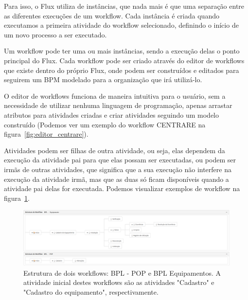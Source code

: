 Para isso, o Flux utiliza de instâncias, que nada mais é que uma separação entre as diferentes execuções de um workflow. Cada instância é criada quando executamos a primeira atividade do workflow selecionado, definindo o início de um novo processo a ser executado.

Um workflow pode ter uma ou mais instâncias, sendo a execução delas o ponto principal do Flux.
Cada workflow pode ser criado através do editor de workflows que existe dentro do próprio Flux, onde podem ser construídos e editados para seguirem um BPM modelado para a organização que irá utilizá-lo.

O editor de workflows funciona de maneira intuitiva para o usuário, sem a necessidade de utilizar nenhuma linguagem de programação, apenas arrastar atributos para atividades criadas e criar atividades seguindo um modelo construído (Podemos ver um exemplo do workflow CENTRARE na figura~\ref{fig:editor_centrare}).

Atividades podem ser filhas de outra atividade, ou seja, elas dependem da execução da atividade pai para que elas possam ser executadas, ou podem ser irmãs de outras atividades, que significa que a sua execução não interfere na execução da atividade irmã, mas que as duas só ficam disponíveis quando a atividade pai delas for executada. Podemos visualizar exemplos de workflow na figura~\ref{fig:estrutura_workflow}.

\begin{figure}
    \centering
    \includegraphics[width=1\textwidth]{imgs/BPL/estrutura.png}
    \caption{Estrutura de dois workflows: BPL - POP e BPL Equipamentos. A atividade inicial destes workflows são as atividades "Cadastro" e "Cadastro do equipamento", respectivamente.}
    \label{fig:estrutura_workflow}
\end{figure}

